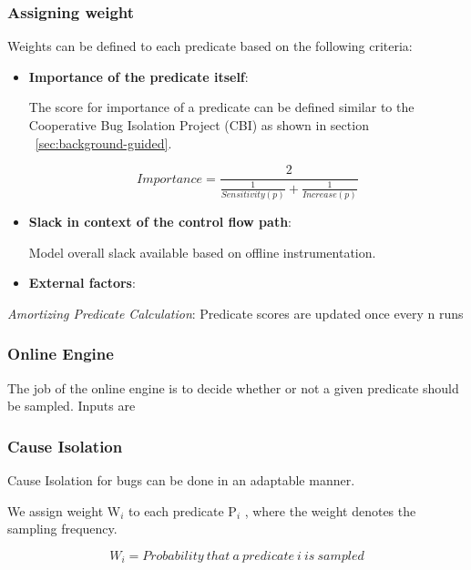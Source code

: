 \subsubsection{Assigning weight}

Weights can be defined to each predicate based on the following criteria:

\begin{itemize}
	
\item \textbf{Importance of the predicate itself}: 

The score for importance of a predicate can be defined similar to the Cooperative Bug Isolation Project (CBI) as shown in section ~\ref{sec:background-guided}. 

\begin{equation}
\label{eq:importance}
Importance = \frac{2}{\frac{1}{Sensitivity(p)}+\frac{1}{Increase(p)}}
\end{equation}


\item \textbf{Slack in context of the control flow path}: 

Model overall slack available based on offline instrumentation. 
 
\item \textbf{External factors}:

\end{itemize}

\textit{Amortizing Predicate Calculation}: Predicate scores are updated once every n runs

\subsubsection{Online Engine}

The job of the online engine is to decide whether or not a given predicate should be sampled. 
Inputs are 


\subsubsection{Cause Isolation}
\label{sec:cause_isolation}

Cause Isolation for bugs can be done in an adaptable manner. 

We assign weight W$_{i}$ to each predicate P$_{i}$ , where the weight denotes the sampling frequency.

\begin{equation}
    W_{i} = Probability\ that\ a\ predicate\ i\ is\ sampled
\end{equation}

